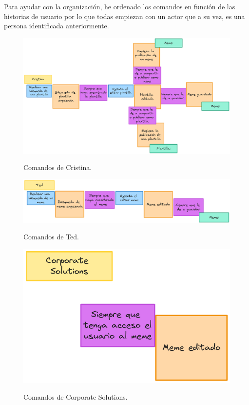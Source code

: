 Para ayudar con la organización, he ordenado los comandos en función de las historias de usuario por lo que todas empiezan con un actor que a su vez, es una persona identificada anteriormente.

\begin{figure}[H]
    \caption{Comandos de Cristina.}
    \centering
    \vspace*{0.5cm}
    \includegraphics[scale=0.15]{figuras/cristinacommands.png}\label{fig:figuras/cristinacommands.png}
\end{figure}

\begin{figure}[H]
    \caption{Comandos de Ted.}
    \centering
    \vspace*{0.5cm}
    \includegraphics[scale=0.2]{figuras/tedcommands.png}\label{fig:figuras/tedcommands.png}
\end{figure}

\begin{figure}[H]
    \caption{Comandos de Corporate Solutions.}
    \centering
    \vspace*{0.5cm}
    \includegraphics[scale=0.2]{figuras/corporatecommands.png}\label{fig:figuras/corporatecommands.png}
\end{figure}


